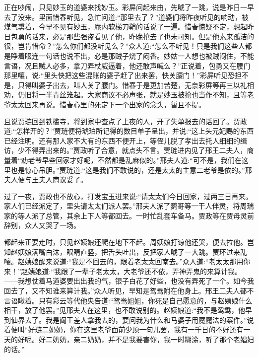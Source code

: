 \begin{parag}
    正在吵闹，只见妙玉的道婆来找妙玉。彩屏问起来由，先唬了一跳，说是昨日一早去了没来。里面惜春听见，急忙问道:“那里去了？”道婆们将昨夜听见的响动，被煤气熏着，今早不见有妙玉，庵内软梯刀鞘的话说了一遍。惜春惊疑不定，想起昨日包勇的话来，必是那些强盗看见了他，昨晚抢去了也未可知。但是他素来孤洁的很，岂肯惜命？”怎么你们都没听见么？”众人道:“怎么不听见！只是我们这些人都是睁着眼连一句话也说不出，必是那贼子烧了闷香。妙姑一人想也被贼闷住，不能言语，况且贼人必多，拿刀弄杖威逼着，他还敢声喊么？”正说着，包勇又在腰门那里嚷，说:“里头快把这些混账的婆子赶了出来罢，快关腰门！”彩屏听见恐担不是，只得叫婆子出去，叫人关了腰门。惜春于是更加苦楚，无奈彩屏等再三以礼相劝，仍旧将一半青丝笼起。大家商议不必声张，就是妙玉被抢也当作不知，且等老爷太太回来再说。惜春心里的死定下一个出家的念头，暂且不提。
\end{parag}


\begin{parag}
    且说贾琏回到铁槛寺，将到家中查点了上夜的人，开了失单报去的话回了。贾政道:“怎样开的？”贾琏便将琥珀所记得的数目单子呈出，并说:“这上头元妃赐的东西已经注明。还有那人家不大有的东西不便开上，等侄儿脱了孝出去托人细细的缉访，少不得弄出来的。”贾政听了合意，就点头不言。贾琏进内见了邢王二夫人，商量着“劝老爷早些回家才好呢，不然都是乱麻似的。”邢夫人道:“可不是，我们在这里也是惊心吊胆。”贾琏道:“这是我们不敢说的，还是太太的主意二老爷是依的。”邢夫人便与王夫人商议妥了。
\end{parag}


\begin{parag}
    过了一夜，贾政也不放心，打发宝玉进来说:“请太太们今日回家，过两三日再来。家人们已经派定了，里头请太太们派人罢。”邢夫人派了鹦哥等一干人伴灵，将周瑞家的等人派了总管，其余上下人等都回去。一时忙乱套车备马。贾政等在贾母灵前辞别，众人又哭了一场。
\end{parag}


\begin{parag}
    都起来正要走时，只见赵姨娘还爬在地下不起。周姨娘打谅他还哭，便去拉他。岂知赵姨娘满嘴白沫，眼睛直竖，把舌头吐出，反把家人唬了一大跳。贾环过来乱嚷。赵姨娘醒来说道:“我是不回去的，跟着老太太回南去。”众人道:“老太太那用你来！”赵姨娘道:“我跟了一辈子老太太，大老爷还不依，弄神弄鬼的来算计我。——我想仗着马道婆要出出我的气，银子白花了好些，也没有弄死了一个。如今我回去了，又不知谁来算计我。”众人听见，早知是鸳鸯附在他身上。邢王二夫人都不言语瞅着。只有彩云等代他央告道:“鸳鸯姐姐，你死是自己愿意的，与赵姨娘什么相干，放了他罢。”见邢夫人在这里，也不敢说别的。赵姨娘道:“我不是鸳鸯，他早到仙界去了。我是阎王差人拿我去的，要问我为什么和马婆子用魇魔法的案件。”说着便叫“好琏二奶奶，你在这里老爷面前少顶一句儿罢，我有一千日的不好还有一天的好呢。好二奶奶，亲二奶奶，并不是我要害你，我一时糊涂，听了那个老娼妇的话。”
\end{parag}


